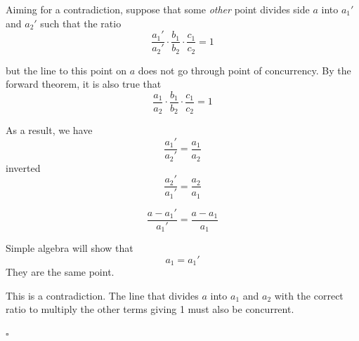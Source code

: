 \documentclass[11pt, oneside]{article}
\begin{document}
Aiming for a contradiction, suppose that some \emph{other} point divides side $a$ into $a_1'$ and $a_2'$ such that the ratio 
\[ \frac{a_1'}{a_2'} \cdot \frac{b_1}{b_2} \cdot \frac{c_1}{c_2} = 1 \]

but the line to this point on $a$ does not go through point of concurrency.  By the forward theorem, it is also true that 
\[ \frac{a_1}{a_2} \cdot \frac{b_1}{b_2} \cdot \frac{c_1}{c_2} = 1 \]

As a result, we have
\[ \frac{a_1'}{a_2'} = \frac{a_1}{a_2} \]
inverted
\[ \frac{a_2'}{a_1'} = \frac{a_2}{a_1} \]

\[ \frac{a - a_1'}{a_1'} = \frac{a - a_1}{a_1} \]

Simple algebra will show that
\[ a_1 = a_1' \]
They are the same point.  

This is a contradiction.  The line that divides $a$ into $a_1$ and $a_2$ with the correct ratio to multiply the other terms giving 1 must also be concurrent.

$\square$
\end{document}
